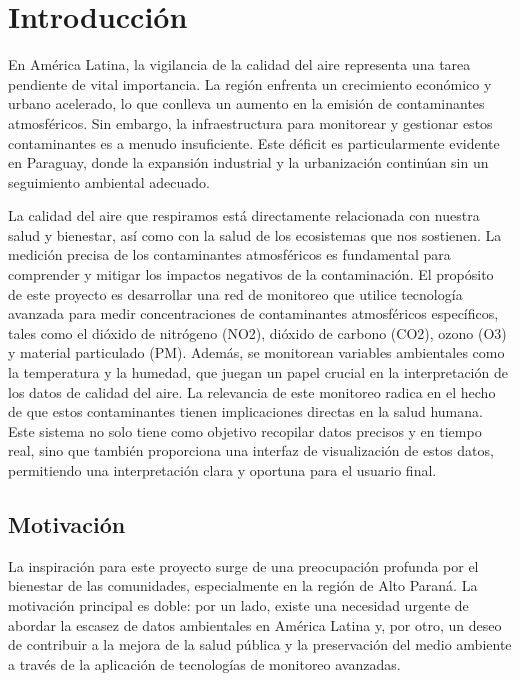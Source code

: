 \fancyhead{}
\fancyfoot{}
\cfoot{\thepage}

\chapter{Introducción}

En América Latina, la vigilancia de la calidad del aire representa una tarea pendiente de vital importancia. La región enfrenta un crecimiento económico y urbano acelerado, lo que conlleva un aumento en la emisión de contaminantes atmosféricos. Sin embargo, la infraestructura para monitorear y gestionar estos contaminantes es a menudo insuficiente. Este déficit es particularmente evidente en Paraguay, donde la expansión industrial y la urbanización continúan sin un seguimiento ambiental adecuado.

La calidad del aire que respiramos está directamente relacionada con nuestra salud y bienestar, así como con la salud de los ecosistemas que nos sostienen. La medición precisa de los contaminantes atmosféricos es fundamental para comprender y mitigar los impactos negativos de la contaminación. El propósito de este proyecto es desarrollar una red de monitoreo que utilice tecnología avanzada para medir concentraciones de contaminantes atmosféricos específicos, tales como el dióxido de nitrógeno (NO2), dióxido de carbono (CO2), ozono (O3) y material particulado (PM). Además, se monitorean variables ambientales como la temperatura y la humedad, que juegan un papel crucial en la interpretación de los datos de calidad del aire. La relevancia de este monitoreo radica en el hecho de que estos contaminantes tienen implicaciones directas en la salud humana. Este sistema no solo tiene como objetivo recopilar datos precisos y en tiempo real, sino que también proporciona una interfaz de visualización de estos datos, permitiendo una interpretación clara y oportuna para el usuario final.





\section{Motivación}
La inspiración para este proyecto surge de una preocupación profunda por el bienestar de las comunidades, especialmente en la región de Alto Paraná. La motivación principal es doble: por un lado, existe una necesidad urgente de abordar la escasez de datos ambientales en América Latina y, por otro, un deseo de contribuir a la mejora de la salud pública y la preservación del medio ambiente a través de la aplicación de tecnologías de monitoreo avanzadas.

